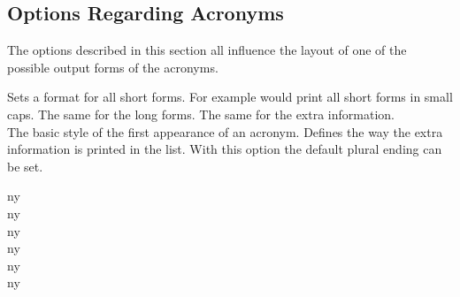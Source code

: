 \documentclass[DIV10,toc=index,toc=bib]{cnpkgdoc}
\begin{document}
\subsection{Options Regarding Acronyms}
The options described in this section all influence the layout of one of the
possible output forms of the acronyms.
\begin{beschreibung}
 \Default Sets a format for all short forms.
 For example  would print all short forms in
 small caps.
 \Default The same for the long forms.
 \Default The same for the extra information.
 \\
 \null{}
 The basic style of the first appearance of an acronym.
  Defines the way
 the extra information is printed in the list.
  With this option the default
 plural ending can be set.
\end{beschreibung}

\begin{beispiel}
 \acf{ny} \\
 \acf{ny} \\
 \acf{ny} \\
 \acf{ny} \\
 \acf{ny} \\
 \acf{ny}
\end{beispiel}
\end{document}
